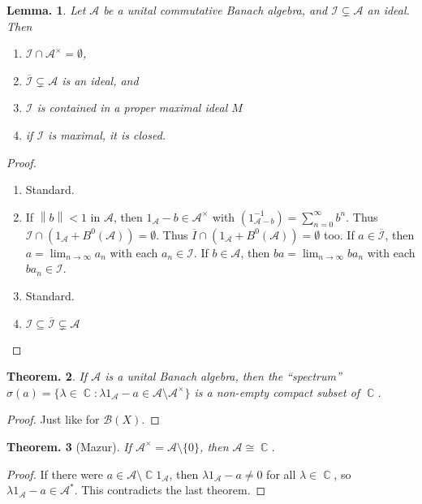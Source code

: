 \documentclass[11pt, a4paper]{memoir}
\DeclareMathOperator{\C}{{\mathbb{C}}}
\newcommand{\norm}[1]{\ensuremath{\left\lVert#1\right\rVert}}
\theoremstyle{change}
\newtheorem{theorem}{Theorem.}[section]
\newtheorem{lemma}[theorem]{Lemma.}
\theoremstyle{plain}
\theoremstyle{nonumberplain}
\newtheorem{proof}{Proof}
\numberwithin{equation}{section}
\begin{document}
\begin{lemma}
    Let $\mathcal{A}$ be a unital commutative Banach algebra, and $\mathcal{I}\subsetneq\mathcal{A}$ an ideal.
    Then
    \begin{enumerate}[nl,r]
        \item$\mathcal{I}\cap\mathcal{A}^\times=\emptyset$,
        \item $\overline{\mathcal{I}}\subsetneq\mathcal{A}$ is an ideal, and
        \item $\mathcal{I}$ is contained in a proper maximal ideal $M$
        \item if $\mathcal{I}$ is maximal, it is closed.
    \end{enumerate}
\end{lemma}
\begin{proof}
    \begin{enumerate}[nl,r]
        \item Standard.
        \item If $\norm{b}<1$ in $\mathcal{A}$, then $1_{\mathcal{A}}-b\in\mathcal{A}^\times$ with $\left(1_{\mathcal{A}-b}^{-1}\right)=\sum_{n=0}^\infty b^n$.
            Thus $\mathcal{\mathcal{I}}\cap\left(1_{\mathcal{A}}+B^0(\mathcal{A})\right)=\emptyset$.
            Thus $\overline{I}\cap(1_{\mathcal{A}}+B^0(\mathcal{A}))=\emptyset$ too.
            If $a\in\overline{\mathcal{I}}$, then $a=\lim_{n\to\infty}a_n$ with each $a_n\in\mathcal{I}$.
            If $b\in\mathcal{A}$, then $ba=\lim_{n\to\infty}ba_n$ with each $ba_n\in\mathcal{I}$.
        \item Standard.
        \item $\mathcal{I}\subseteq\overline{\mathcal{I}}\subsetneq\mathcal{A}$
    \end{enumerate}
\end{proof}
\begin{theorem}
    If $\mathcal{A}$ is a unital Banach algebra, then the ``spectrum'' $\sigma(a)=\{\lambda\in \C:\lambda 1_{\mathcal{A}}-a\in \mathcal{A}\setminus\mathcal{A}^\times\}$ is a non-empty compact subset of $\C$.
\end{theorem}
\begin{proof}
    Just like for $\mathcal{B}(X)$.
\end{proof}
\begin{theorem}[Mazur]
    If $\mathcal{A}^\times=\mathcal{A}\setminus\{0\}$, then $\mathcal{A}\cong\C$.
\end{theorem}
\begin{proof}
    If there were $a\in\mathcal{A}\setminus \C1_{\mathcal{A}}$, then $\lambda 1_{\mathcal{A}}-a\neq 0$ for all $\lambda\in\C$, so $\lambda 1_{\mathcal{A}}-a\in\mathcal{A}^*$.
    This contradicts the last theorem.
\end{proof}
\end{document}
